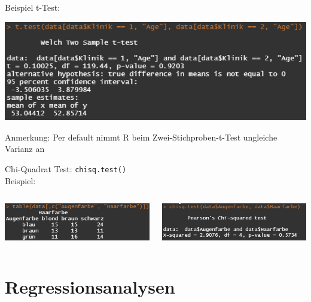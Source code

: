 \documentclass[aspectratio = 169]{chariteBeamer}
\begin{document}
\begin{frame}[fragile]{Beispiel t-Test:}	
	\begin{center}
		\includegraphics{TwoSampleTtest}
	\end{center}
Anmerkung: Per default nimmt R beim Zwei-Stichproben-t-Test ungleiche Varianz an
\end{frame}

\begin{frame}[fragile]{Chi-Quadrat Test:}	
	\verb+chisq.test()+ \\

	Beispiel: \\
	\begin{columns}[T]
		\begin{column}{0.5\textwidth}
			\includegraphics[width=7.5cm]{tabledata}
		\end{column}
		\begin{column}{0.5\textwidth}
			\includegraphics[width=7.5cm]{chisq}
		\end{column}
	\end{columns}
\end{frame}


\section{Regressionsanalysen}
\end{document}

